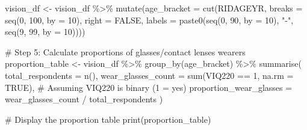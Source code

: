 \documentclass[
  12pt,
]{article}
\newenvironment{Shaded}{\begin{snugshade}}{\end{snugshade}}
\newcommand{\AttributeTok}[1]{\textcolor[rgb]{0.40,0.45,0.13}{#1}}
\newcommand{\CommentTok}[1]{\textcolor[rgb]{0.37,0.37,0.37}{#1}}
\newcommand{\ConstantTok}[1]{\textcolor[rgb]{0.56,0.35,0.01}{#1}}
\newcommand{\DecValTok}[1]{\textcolor[rgb]{0.68,0.00,0.00}{#1}}
\newcommand{\DocumentationTok}[1]{\textcolor[rgb]{0.37,0.37,0.37}{\textit{#1}}}
\newcommand{\FunctionTok}[1]{\textcolor[rgb]{0.28,0.35,0.67}{#1}}
\newcommand{\NormalTok}[1]{\textcolor[rgb]{0.00,0.23,0.31}{#1}}
\newcommand{\OtherTok}[1]{\textcolor[rgb]{0.00,0.23,0.31}{#1}}
\newcommand{\SpecialCharTok}[1]{\textcolor[rgb]{0.37,0.37,0.37}{#1}}
\newcommand{\StringTok}[1]{\textcolor[rgb]{0.13,0.47,0.30}{#1}}
\begin{document}
\begin{Shaded}
\end{Shaded}

\begin{Shaded}
\begin{Highlighting}[]
\NormalTok{vision\_df }\OtherTok{\textless{}{-}}\NormalTok{ vision\_df }\SpecialCharTok{\%\textgreater{}\%} \FunctionTok{mutate}\NormalTok{(}\AttributeTok{age\_bracket =} \FunctionTok{cut}\NormalTok{(RIDAGEYR, }\AttributeTok{breaks =} \FunctionTok{seq}\NormalTok{(}\DecValTok{0}\NormalTok{, }\DecValTok{100}\NormalTok{, }\AttributeTok{by =} \DecValTok{10}\NormalTok{), }\AttributeTok{right =} \ConstantTok{FALSE}\NormalTok{, }\AttributeTok{labels =} \FunctionTok{paste0}\NormalTok{(}\FunctionTok{seq}\NormalTok{(}\DecValTok{0}\NormalTok{, }\DecValTok{90}\NormalTok{, }\AttributeTok{by =} \DecValTok{10}\NormalTok{), }\StringTok{"{-}"}\NormalTok{, }\FunctionTok{seq}\NormalTok{(}\DecValTok{9}\NormalTok{, }\DecValTok{99}\NormalTok{, }\AttributeTok{by =} \DecValTok{10}\NormalTok{))))}

\CommentTok{\# Step 5: Calculate proportions of glasses/contact lenses wearers}
\NormalTok{proportion\_table }\OtherTok{\textless{}{-}}\NormalTok{ vision\_df }\SpecialCharTok{\%\textgreater{}\%}
  \FunctionTok{group\_by}\NormalTok{(age\_bracket) }\SpecialCharTok{\%\textgreater{}\%}
  \FunctionTok{summarise}\NormalTok{(}
    \AttributeTok{total\_respondents =} \FunctionTok{n}\NormalTok{(),}
    \AttributeTok{wear\_glasses\_count =} \FunctionTok{sum}\NormalTok{(VIQ220 }\SpecialCharTok{==} \DecValTok{1}\NormalTok{, }\AttributeTok{na.rm =} \ConstantTok{TRUE}\NormalTok{),  }\CommentTok{\# Assuming \textquotesingle{}VIQ220\textquotesingle{} is binary (1 = yes)}
    \AttributeTok{proportion\_wear\_glasses =}\NormalTok{ wear\_glasses\_count }\SpecialCharTok{/}\NormalTok{ total\_respondents}
\NormalTok{  )}

\CommentTok{\# Display the proportion table}
\FunctionTok{print}\NormalTok{(proportion\_table)}
\end{Highlighting}
\end{Shaded}
\end{document}
